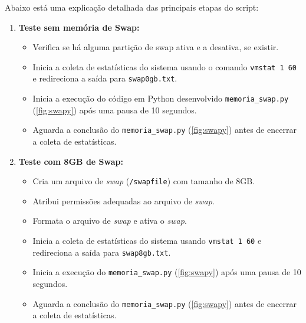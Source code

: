 \documentclass[
	12pt,				%
	openright,			%
	oneside,			%
	a4paper,			%
	chapter=TITLE,		%
	english,			%
	french,				%
	spanish,			%
	brazil				%
	]{abntex2}
\theoremstyle{definition}
\begin{document}
Abaixo está uma explicação detalhada das principais etapas do script:


\begin{enumerate}[label=\arabic*.]
    \item \textbf{Teste sem memória de Swap:}
    \begin{itemize}
        \item Verifica se há alguma partição de swap ativa e a desativa, se existir.
        \item Inicia a coleta de estatísticas do sistema usando o comando \texttt{vmstat 1 60} e redireciona a saída para \texttt{swap0gb.txt}.
        \item Inicia a execução do código em Python desenvolvido \texttt{memoria\_swap.py} (\ref{fig:swapy})  após uma pausa de 10 segundos.
        \item Aguarda a conclusão do \texttt{memoria\_swap.py} (\ref{fig:swapy}) antes de encerrar a coleta de estatísticas.
    \end{itemize}

    \item \textbf{Teste com 8GB de Swap:}
    \begin{itemize}
        \item Cria um arquivo de \textit{swap} (\texttt{/swapfile}) com tamanho de 8GB.
        \item Atribui permissões adequadas ao arquivo de \textit{swap}.
        \item Formata o arquivo de \textit{swap} e ativa o \textit{swap}.
        \item Inicia a coleta de estatísticas do sistema usando \texttt{vmstat 1 60} e redireciona a saída para \texttt{swap8gb.txt}.
        \item Inicia a execução do \texttt{memoria\_swap.py} (\ref{fig:swapy}) após uma pausa de 10 segundos.
        \item Aguarda a conclusão do \texttt{memoria\_swap.py} (\ref{fig:swapy}) antes de encerrar a coleta de estatísticas.
    \end{itemize}


\end{enumerate}
\end{document}
